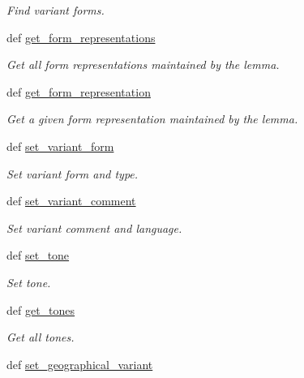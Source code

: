 \begin{DoxyCompactItemize}
\begin{DoxyCompactList}\small\item\em Find variant forms. \end{DoxyCompactList}\item 
def \hyperlink{classlmf_1_1src_1_1morphology_1_1lemma_1_1_lemma_aaafc76e4a436188c2ac07417b02e530d}{get\+\_\+form\+\_\+representations}
\begin{DoxyCompactList}\small\item\em Get all form representations maintained by the lemma. \end{DoxyCompactList}\item 
def \hyperlink{classlmf_1_1src_1_1morphology_1_1lemma_1_1_lemma_a71c4c7715794ecd41e5176485f6d7f65}{get\+\_\+form\+\_\+representation}
\begin{DoxyCompactList}\small\item\em Get a given form representation maintained by the lemma. \end{DoxyCompactList}\item 
def \hyperlink{classlmf_1_1src_1_1morphology_1_1lemma_1_1_lemma_a16942d5bd7973fc19eee27a68789dcf5}{set\+\_\+variant\+\_\+form}
\begin{DoxyCompactList}\small\item\em Set variant form and type. \end{DoxyCompactList}\item 
def \hyperlink{classlmf_1_1src_1_1morphology_1_1lemma_1_1_lemma_a8d090ef91e9c98ef77d429b3d7296022}{set\+\_\+variant\+\_\+comment}
\begin{DoxyCompactList}\small\item\em Set variant comment and language. \end{DoxyCompactList}\item 
def \hyperlink{classlmf_1_1src_1_1morphology_1_1lemma_1_1_lemma_a094ea5bc786ebf4356bbb1e33c418b92}{set\+\_\+tone}
\begin{DoxyCompactList}\small\item\em Set tone. \end{DoxyCompactList}\item 
def \hyperlink{classlmf_1_1src_1_1morphology_1_1lemma_1_1_lemma_a02afd08362639bdbbac98b35c533375f}{get\+\_\+tones}
\begin{DoxyCompactList}\small\item\em Get all tones. \end{DoxyCompactList}\item 
def \hyperlink{classlmf_1_1src_1_1morphology_1_1lemma_1_1_lemma_a4df66dfca0f2cdf379fa8782d86ba05f}{set\+\_\+geographical\+\_\+variant}

\end{DoxyCompactItemize}

